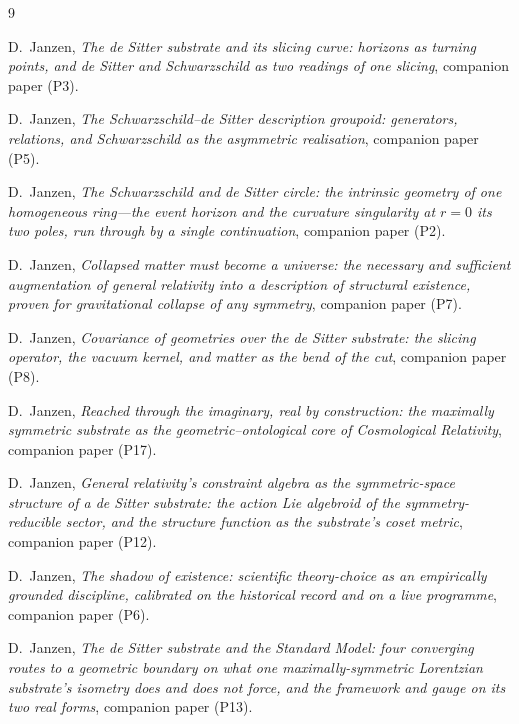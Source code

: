 \documentclass[11pt,a4paper]{article}
\theoremstyle{definition}
\begin{document}
\begin{thebibliography}{9}

D.~Janzen,
\emph{The de Sitter substrate and its slicing curve: horizons as turning points, and de Sitter and Schwarzschild as two readings of one slicing}, companion paper (P3).

D.~Janzen,
\emph{The Schwarzschild--de Sitter description groupoid: generators, relations, and Schwarzschild as the asymmetric realisation}, companion paper (P5).

D.~Janzen,
\emph{The Schwarzschild and de Sitter circle: the intrinsic geometry of one homogeneous ring---the event horizon and the curvature singularity at $r=0$ its two poles, run through by a single continuation}, companion paper (P2).

 D.~Janzen, \emph{Collapsed matter must become a universe: the necessary and sufficient augmentation of general relativity into a description of structural existence, proven for gravitational collapse of any symmetry}, companion paper (P7).

D.~Janzen,
\emph{Covariance of geometries over the de Sitter substrate: the slicing operator, the vacuum kernel, and matter as the bend of the cut}, companion paper (P8).

D.~Janzen,
\emph{Reached through the imaginary, real by construction: the maximally symmetric substrate as the geometric--ontological core of Cosmological Relativity}, companion paper (P17).

D.~Janzen,
\emph{General relativity's constraint algebra as the symmetric-space structure of a de Sitter substrate: the action Lie algebroid of the symmetry-reducible sector, and the structure function as the substrate's coset metric}, companion paper (P12).

D.~Janzen,
\emph{The shadow of existence: scientific theory-choice as an empirically grounded discipline, calibrated on the historical record and on a live programme}, companion paper (P6).

D.~Janzen,
\emph{The de Sitter substrate and the Standard Model: four converging routes to a geometric boundary on what one maximally-symmetric Lorentzian substrate's isometry does and does not force, and the framework and gauge on its two real forms}, companion paper (P13).


\end{thebibliography}
\end{document}
